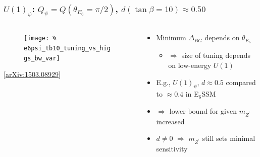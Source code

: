 \documentclass[10pt,aspectratio=169]{beamer}
\begin{document}
\begin{frame}
  \frametitle{$U(1)_\psi$: $Q_\psi = Q(\theta_{E_6} = \pi / 2)$,
    $d(\tan\beta = 10) \approx 0.50$}
  \begin{columns}
    \begin{column}{0.5\textwidth}
      \vspace*{-15pt}
      \begin{figure}
        \texttt{[image: \%
          e6psi\_tb10\_tuning\_vs\_higgs\_bw\_var]}
      \end{figure}
      \begin{center}
        \tiny [\href{https://arxiv.org/abs/1503.08929}{arXiv:1503.08929}]
      \end{center}
    \end{column}
    \begin{column}{0.5\textwidth}
      \begin{itemize} \itemsep1.5em
        \item {\color{blue} Minimum $\Delta_{BG}$ depends on $\theta_{E_6}$}
          \begin{itemize}
            \item $\Rightarrow$ size of tuning depends on low-energy $U(1)$
          \end{itemize}
        \item E.g., $U(1)_\psi$, $d \approx 0.5$ compared to $\approx 0.4$
          in E$_6$SSM
        \item $\Rightarrow$ lower bound for given $m_{Z^\prime}$ increased
        \item $d \neq 0$ $\Rightarrow$ $m_{Z^\prime}$ still sets minimal
          sensitivity
      \end{itemize}
    \end{column}
  \end{columns}
\end{frame}
\end{document}
